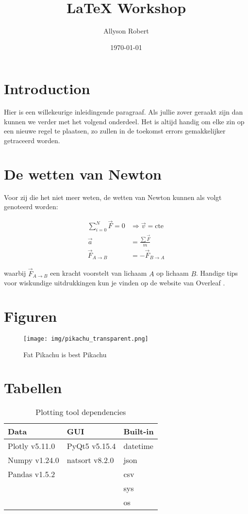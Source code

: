 \documentclass{article}
\title{LaTeX Workshop}
\author{Allyson Robert}
\date{\today}
\begin{document}
\maketitle
\tableofcontents

\section{Introduction}
\label{sec:intro}
Hier is een willekeurige inleidingende paragraaf. 
Als jullie zover geraakt zijn dan kunnen we verder met het volgend onderdeel.
Het is altijd handig om elke zin op een nieuwe regel te plaatsen, zo zullen in de toekomst errors gemakkelijker getraceerd worden.

\section{De wetten van Newton}
Voor zij die het niet meer weten, de wetten van Newton kunnen als volgt genoteerd worden:

\begin{align}
    \sum_{i=0}^{N} \vec{F} = 0 &\Rightarrow \vec{v} = \text{cte}\\
    \vec{a} &= \frac{\sum \vec{F}}{m} \\
    \vec{F}_{A\to B} &= -\vec{F}_{B \to A}
\end{align}

waarbij $\vec{F}_{A \to B}$ een kracht voorstelt van lichaam $A$ op lichaam $B$.
Handige tips voor wiskundige uitdrukkingen kun je vinden op de website van Overleaf \cite{OverleafMath}.

\section{Figuren}
    \begin{figure}[H]
    \centering
    \texttt{[image: img/pikachu\_transparent.png]}
    \caption{Fat Pikachu is best Pikachu}
    \label{fig:pikachu}
\end{figure}

\section{Tabellen}

\begin{table}[H]
\centering
\caption{Plotting tool dependencies}
\label{tab:dependencies}
\begin{tabular}{l|l|l}
\rowcolor[HTML]{EFEFEF} 
Data & GUI & Built-in \\ \hline\hline
Plotly v5.11.0 & PyQt5 v5.15.4 & datetime \\ 
Numpy v1.24.0 & natsort v8.2.0 & json \\ 
Pandas v1.5.2 &  & csv \\ 
 &  & sys \\ 
 &  & os \\ 
\end{tabular}
\end{table}
\end{document}
